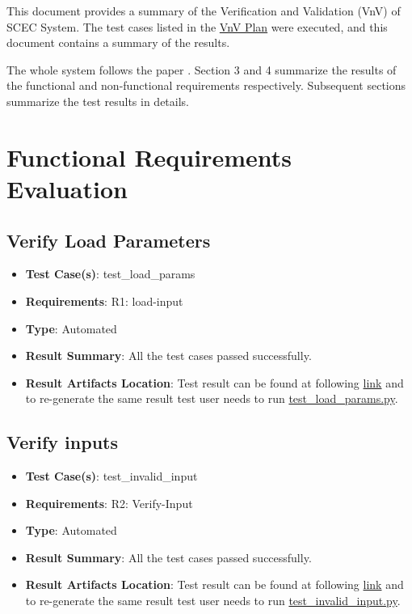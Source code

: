 \documentclass[12pt, titlepage]{article}
\begin{document}
This document provides a summary of the Verification and Validation (VnV) of SCEC System. The test cases listed in the \href{https://github.com/DeeshaPatel/CAS-741-Solar-Cooker/blob/f238dbff9720fb98d3323fd5832d04ab9ce7597f/docs/VnVPlan/VnVPlan.pdf}{VnV Plan} were executed, and this document contains a summary of the results. 

The whole system follows the paper \cite{MathsModel}. Section 3 and 4 summarize the results of the functional and non-functional requirements respectively. Subsequent sections summarize the test results in details. 

\section{Functional Requirements Evaluation}

\subsection{Verify Load Parameters} 
\begin{itemize}
    \item \textbf{Test Case(s)}: test\_load\_params
    \item \textbf{Requirements}: R1: load-input 
    \item \textbf{Type}: Automated 
    \item \textbf{Result Summary}: All the test cases passed successfully. 
    \item \textbf{Result Artifacts Location}: Test result can be found at following \href{https://github.com/DeeshaPatel/CAS-741-Solar-Cooker/blob/f93a820990f621e74d8142be2869c904209dd4e9/test/Functional%20Requirement/test_load_params.log}{link} and to re-generate the same result test user needs to run \href{https://github.com/DeeshaPatel/CAS-741-Solar-Cooker/blob/3e5bf1194efffc31e44fa89c7431ddf429c37407/src/testing/test_load_params.py}{test\_load\_params.py}.  
\end{itemize}

\subsection{Verify inputs} 
\begin{itemize}
    \item \textbf{Test Case(s)}: test\_invalid\_input
    \item \textbf{Requirements}: R2: Verify-Input 
    \item \textbf{Type}: Automated 
    \item \textbf{Result Summary}: All the test cases passed successfully. 
    \item \textbf{Result Artifacts Location}: Test result can be found at following \href{https://github.com/DeeshaPatel/CAS-741-Solar-Cooker/blob/a9d97a05582a38b9ade046dc4aaa492b355a299f/test/Functional%20Requirement/test_invalid_input.log}{link} and to re-generate the same result test user needs to run \href{https://github.com/DeeshaPatel/CAS-741-Solar-Cooker/blob/3e5bf1194efffc31e44fa89c7431ddf429c37407/src/testing/test_invalid_inputs.py}{test\_invalid\_input.py}.  
\end{itemize}
\end{document}

